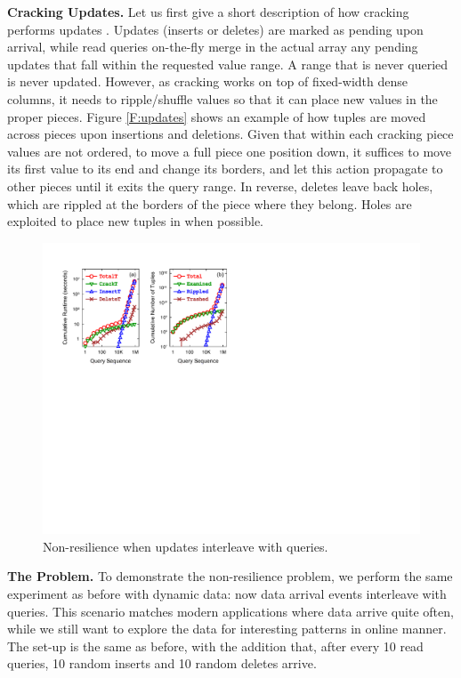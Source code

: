 \documentclass{sig-alternate}
\begin{document}
\textbf{Cracking Updates.} Let us first give a short description of how cracking performs updates \cite{IKM:SIGMOD07}. Updates (inserts or deletes) are marked as pending upon arrival, while read queries on-the-fly merge in the actual array any pending updates that fall within the requested value range. A range that is never queried is never updated. However, as cracking works on top of fixed-width dense columns, it needs to ripple/shuffle values so that it can place new values in the proper pieces. Figure \ref{F:updates} shows an example of how tuples are moved across pieces upon insertions and deletions. Given that within each cracking piece values are not ordered, to move a full piece one position down, it suffices to move its first value to its end and change its borders, and let this action propagate to other pieces until it exits the query range. In reverse, deletes leave back holes, which are rippled at the borders of the piece where they belong. Holes are exploited to place new tuples in when possible.

\begin{figure}[ht]
\center
\includegraphics[width=.9\columnwidth]{graphs/figure4.pdf}
\vspace{-1em}
\caption{Non-resilience when updates interleave with queries.}\label{F:UpdatesProblem}
\vspace{-4mm}
\end{figure}

\textbf{The Problem.} To demonstrate the non-resilience problem, we perform the same experiment as before with dynamic data: now data arrival events interleave with queries. This scenario matches modern applications where data arrive quite often, while we still want to explore the data for interesting patterns in online manner. The set-up is the same as before, with the addition that, after every 10 read queries, 10 random inserts and 10 random deletes arrive.
\end{document}
